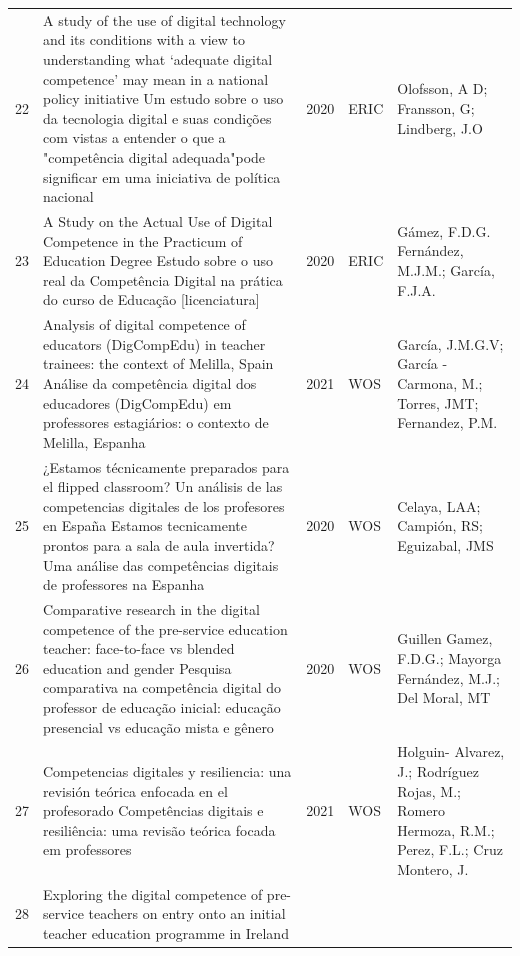 \documentclass[portuguese]{textolivre}
\begin{document}
\begin{small}
\begin{longtable}{
    @{}l >{\raggedright\arraybackslash}p{}
    @{}ll
    >{\raggedright\arraybackslash}p{}@{}
    }
22 & A study of the use of digital technology and its conditions with a view to understanding what ‘adequate digital competence’ may mean in a national policy initiative \newline
Um estudo sobre o uso da tecnologia digital e suas condições com vistas a entender o que a "competência digital adequada"pode significar em uma iniciativa de política nacional & 2020 & ERIC & Olofsson, A D; Fransson, G; Lindberg, J.O \\
23 & A Study on the Actual Use of Digital Competence in the Practicum of Education Degree \newline
Estudo sobre o uso real da Competência Digital na prática do curso de Educação [licenciatura] & 2020 & ERIC & Gámez, F.D.G. Fernández, M.J.M.; García, F.J.A. \\
24 & Analysis of digital competence of educators (DigCompEdu) in teacher trainees: the context of Melilla, Spain \newline
Análise da competência digital dos educadores (DigCompEdu) em professores estagiários: o contexto de Melilla, Espanha & 2021 & WOS & García, J.M.G.V; García -Carmona, M.; Torres, JMT; Fernandez, P.M. \\
25 & ¿Estamos técnicamente preparados para el flipped classroom? Un análisis de las competencias digitales de los profesores en España \newline
Estamos tecnicamente prontos para a sala de aula invertida? Uma análise das competências digitais de professores na Espanha & 2020 & WOS & Celaya, LAA; Campión, RS; Eguizabal, JMS \\
26 & Comparative research in the digital competence of the pre-service education teacher: face-to-face vs blended education and gender \newline
Pesquisa comparativa na competência digital do professor de educação inicial: educação presencial vs educação mista e gênero & 2020 & WOS	& Guillen Gamez, F.D.G.; Mayorga Fernández, M.J.; Del Moral, MT \\
27 & Competencias digitales y resiliencia: una revisión teórica enfocada en el profesorado \newline
Competências digitais e resiliência: uma revisão teórica focada em professores & 2021 & WOS & Holguin- Alvarez, J.; Rodríguez Rojas, M.; Romero Hermoza, R.M.; Perez, F.L.; Cruz Montero, J. \\
28 & Exploring the digital competence of pre-service teachers on entry onto an initial teacher education programme in Ireland \newline

\end{longtable}
\end{small}
\end{document}
